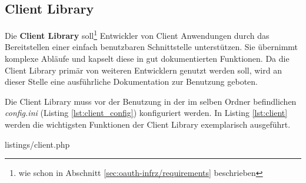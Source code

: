 \documentclass[12pt,a4paper,pointednumbers,abstracton]{scrartcl}
\begin{document}

\subsection{Client Library}
\label{sec:oauth-infrz/client}

Die \textbf{Client Library} soll\footnote{wie schon in Abschnitt \ref{sec:oauth-infrz/requirements} beschrieben} Entwickler von Client Anwendungen durch das Bereitstellen einer einfach benutzbaren Schnittstelle unterstützen.
Sie übernimmt komplexe Abläufe und kapselt diese in gut dokumentierten Funktionen.
Da die Client Library primär von weiteren Entwicklern genutzt werden soll, wird an dieser Stelle eine ausführliche Dokumentation zur Benutzung geboten.

Die Client Library muss vor der Benutzung in der im selben Ordner befindlichen \emph{config.ini} (Listing \ref{lst:client_config}) konfiguriert werden. In Listing \ref{lst:client} werden die wichtigsten Funktionen der Client Library exemplarisch ausgeführt.

\begin{minipage}{\textwidth}
	
	{listings/client.php}
\end{minipage}
\end{document}
